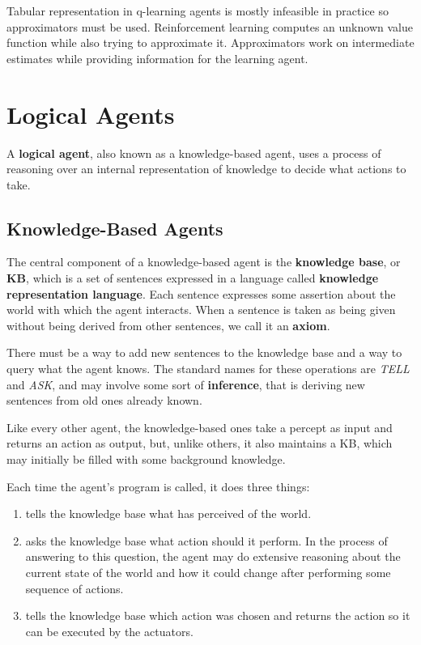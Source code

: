 \documentclass{article}
\begin{document}
Tabular representation in q-learning agents is mostly infeasible in practice so approximators must be used. Reinforcement learning computes an unknown value function while also trying to approximate it. Approximators work on intermediate estimates while providing information for the learning agent.

\section{Logical Agents}
A \textbf{logical agent}, also known as a knowledge-based agent, uses a process of reasoning over an internal representation of knowledge to decide what actions to take.

\subsection{Knowledge-Based Agents}
The central component of a knowledge-based agent is the \textbf{knowledge base}, or \textbf{KB}, which is a set of sentences expressed in a language called \textbf{knowledge representation language}. Each sentence expresses some assertion about the world with which the agent interacts. When a sentence is taken as being given without being derived from other sentences, we call it an \textbf{axiom}.

There must be a way to add new sentences to the knowledge base and a way to query what the agent knows. The standard names for these operations are \textit{TELL} and \textit{ASK}, and may involve some sort of \textbf{inference}, that is deriving new sentences from old ones already known.

Like every other agent, the knowledge-based ones take a percept as input and returns an action as output, but, unlike others, it also maintains a KB, which may initially be filled with some background knowledge.  

Each time the agent's program is called, it does three things:
\begin{enumerate}
    \item tells the knowledge base what has perceived of the world.
    \item asks the knowledge base what action should it perform. In the process of answering to this question, the agent may do extensive reasoning about the current state of the world and how it could change after performing some sequence of actions.
    \item tells the knowledge base which action was chosen and returns the action so it can be executed by the actuators.
\end{enumerate}
\end{document}
